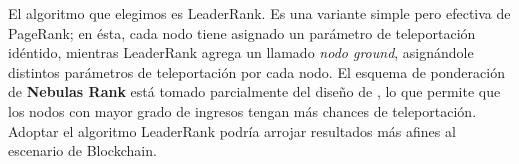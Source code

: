 El algoritmo que elegimos es LeaderRank\cite{Chen2013}\cite{Li2014}. Es una variante simple pero efectiva de PageRank\cite{Brin2010}\cite{page1999pagerank}; en ésta, cada nodo tiene asignado un parámetro de teleportación idéntido, mientras LeaderRank agrega un llamado \textit{nodo ground}, asignándole distintos parámetros de teleportación por cada nodo. El esquema de ponderación de \textbf{Nebulas Rank} está tomado parcialmente del diseño de \cite{Li2014}, lo que permite que los nodos con mayor grado de ingresos tengan más chances de teleportación. Adoptar el algoritmo LeaderRank podría arrojar resultados más afines al escenario de Blockchain.